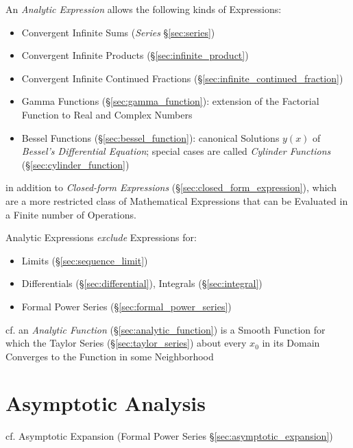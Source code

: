 An \emph{Analytic Expression} allows the following kinds of Expressions:
\begin{itemize}
  \item Convergent Infinite Sums (\emph{Series} \S\ref{sec:series})
  \item Convergent Infinite Products (\S\ref{sec:infinite_product})
  \item Convergent Infinite Continued Fractions
    (\S\ref{sec:infinite_continued_fraction})
  \item Gamma Functions (\S\ref{sec:gamma_function}): extension of the Factorial
    Function to Real and Complex Numbers
  \item Bessel Functions (\S\ref{sec:bessel_function}): canonical Solutions
    $y(x)$ of \emph{Bessel's Differential Equation}; special cases are called
    \emph{Cylinder Functions} (\S\ref{sec:cylinder_function})
\end{itemize}
in addition to \emph{Closed-form Expressions}
(\S\ref{sec:closed_form_expression}), which are a more restricted class of
Mathematical Expressions that can be Evaluated in a Finite number of Operations.

Analytic Expressions \emph{exclude} Expressions for:
\begin{itemize}
  \item Limits (\S\ref{sec:sequence_limit})
  \item Differentials (\S\ref{sec:differential}), Integrals
    (\S\ref{sec:integral})
  \item Formal Power Series (\S\ref{sec:formal_power_series})
\end{itemize}

\fist cf. an \emph{Analytic Function} (\S\ref{sec:analytic_function}) is a
Smooth Function for which the Taylor Series (\S\ref{sec:taylor_series}) about
every $x_0$ in its Domain Converges to the Function in some Neighborhood



\section{Asymptotic Analysis}\label{sec:asymptotic_analysis}


\fist cf. Asymptotic Expansion (Formal Power Series
\S\ref{sec:asymptotic_expansion})

